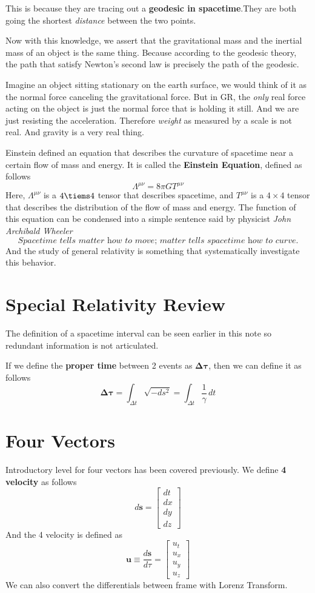 \documentclass[12pt]{book}
\begin{document}
This is because they are tracing out a \textbf{geodesic in spacetime}.They are both going the shortest \textit{distance} between the two points. 

Now with this knowledge, we assert that the gravitational mass and the inertial mass of an object is the same thing. Because according to the geodesic theory, the path that satisfy Newton's second law is precisely the path of the geodesic. 

Imagine an object sitting stationary on the earth surface, we would think of it as the normal force canceling the gravitational force. But in GR, the \textit{only} real force acting on the object is just the normal force that is holding it still. And we are just resisting the acceleration. Therefore \textit{weight} as measured by a scale is not real. And gravity is a very real thing. 

Einstein defined an equation that describes the curvature of spacetime near a certain flow of mass and energy. It is called the \textbf{Einstein Equation}, defined as follows
\[
\Lambda^{\mu\nu} = 8\pi GT^{\mu\nu}
\]
Here, $\Lambda^{\mu\nu}$ is a $4\tiems4$ tensor that describes spacetime, and $T^{\mu\nu}$ is a $4\times4$ tensor that describes the distribution of the flow of mass and energy. The function of this equation can be condensed into a simple sentence said by physicist \textit{John Archibald Wheeler}
\[
\textit{Spacetime tells matter how to move; matter tells spacetime how to curve.}
\]
And the study of general relativity is something that systematically investigate this behavior. 


\section{Special Relativity Review}
The definition of a spacetime interval can be seen earlier in this note so redundant information is not articulated. 

If we define the \textbf{proper time} between 2 events as $\boldsymbol\Delta\boldsymbol\tau$, then we can define it as follows
\[
\boldsymbol\Delta\boldsymbol\tau = \int_{\Delta t }\sqrt{-ds^2} =\int_{\Delta t} \frac{1}{\gamma}\,dt
\]



\section{Four Vectors}
Introductory level for four vectors has been covered previously. We define \textbf{4 velocity} as follows
\[
d\mathbf{s} = \begin{bmatrix}
    dt\\dx\\dy\\dz
\end{bmatrix}
\]
And the 4 velocity is defined as
\[
\mathbf{u}\equiv \frac{d\mathbf{s}}{d\tau}=
\begin{bmatrix}
    u_t\\u_x\\u_y\\u_z
\end{bmatrix}
\]
We can also convert the differentials between frame with Lorenz Transform.
\end{document}
